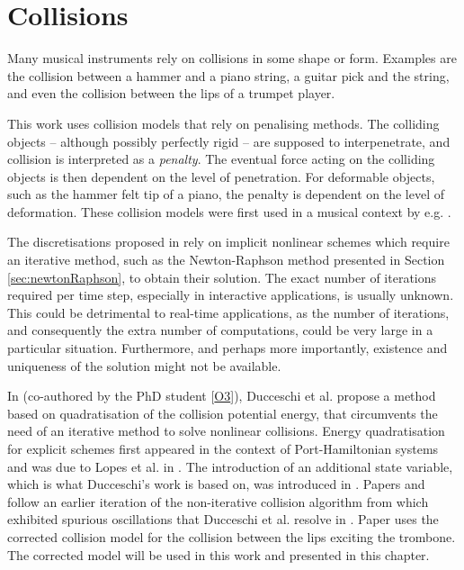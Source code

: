 \chapter{Collisions}\label{ch:collisions}
Many musical instruments rely on collisions in some shape or form. Examples are the collision between a hammer and a piano string, a guitar pick and the string, and even the collision between the lips of a trumpet player. 

This work uses collision models that rely on penalising methods. The colliding objects -- although possibly perfectly rigid -- are supposed to interpenetrate, and collision is interpreted as a \textit{penalty}. The eventual force acting on the colliding objects is then dependent on the level of penetration. For deformable objects, such as the hammer felt tip of a piano, the penalty is dependent on the level of deformation. These collision models were first used in a musical context by e.g. \cite{Chatziioannou2013, Bilbao2014}.

The discretisations proposed in \cite{Chatziioannou2013, Bilbao2014} rely on implicit nonlinear schemes which require an iterative method, such as the Newton-Raphson method presented in Section \ref{sec:newtonRaphson}, to obtain their solution. 
The exact number of iterations required per time step, especially in interactive applications, is usually unknown. This could be detrimental to real-time applications, as the number of iterations, and consequently the extra number of computations, could be very large in a particular situation. Furthermore, and perhaps more importantly, existence and uniqueness of the solution might not be available. 

In \cite{Ducceschi2021} (co-authored by the PhD student [\hyperref[ch:listOfPublications]{O3}]), Ducceschi et al. propose a method based on quadratisation of the collision potential energy, that circumvents the need of an iterative method to solve nonlinear collisions. Energy quadratisation for explicit schemes first appeared in the context of Port-Hamiltonian systems and was due to Lopes et al. in \cite{Lopes2015}. The introduction of an additional state variable, which is what Ducceschi's work is based on, was introduced in \cite{Yang2017, Jiang2019}. Papers \citeP[D] and \citeP[E] follow an earlier iteration of the non-iterative collision algorithm from \cite{Ducceschi2019, Bilbao2019} which exhibited spurious oscillations that Ducceschi et al. resolve in \cite{Ducceschi2021}. Paper \citeP[H] uses the corrected collision model for the collision between the lips exciting the trombone. The corrected model will be used in this work and presented in this chapter. 

